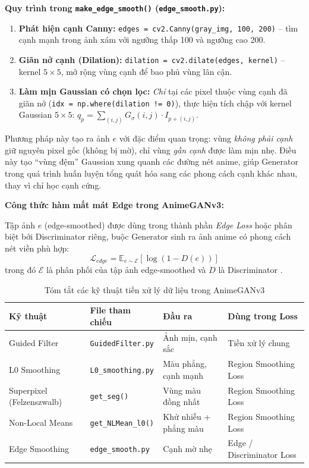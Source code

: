 \textbf{Quy trình trong \texttt{make\_edge\_smooth()} (\texttt{edge\_smooth.py}):}
\begin{enumerate}
    \item \textbf{Phát hiện cạnh Canny:} \texttt{edges = cv2.Canny(gray\_img, 100, 200)}
    -- tìm cạnh mạnh trong ảnh xám với ngưỡng thấp 100 và ngưỡng cao 200.
    \item \textbf{Giãn nở cạnh (Dilation):} \texttt{dilation = cv2.dilate(edges, kernel)}
    -- kernel $5 \times 5$, mở rộng vùng cạnh để bao phủ vùng lân cận.
    \item \textbf{Làm mịn Gaussian có chọn lọc:} \textit{Chỉ} tại các pixel thuộc vùng cạnh
    đã giãn nở (\texttt{idx = np.where(dilation != 0)}), thực hiện tích chập với kernel
    Gaussian $5 \times 5$: $q_p = \sum_{(i,j)} G_{\sigma}(i,j) \cdot I_{p+(i,j)}$.
\end{enumerate}

Phương pháp này tạo ra ảnh $e$ với đặc điểm quan trọng: vùng \textit{không phải cạnh} giữ
nguyên pixel gốc (không bị mờ), chỉ vùng \textit{gần cạnh} được làm mịn nhẹ. Điều này
tạo ``vùng đệm'' Gaussian xung quanh các đường nét anime, giúp Generator trong quá trình
huấn luyện tổng quát hóa sang các phong cách cạnh khác nhau, thay vì chỉ học cạnh cứng.

\textbf{Công thức hàm mất mát Edge trong AnimeGANv3:}

Tập ảnh $e$ (edge-smoothed) được dùng trong thành phần \textit{Edge Loss} hoặc phân biệt
bởi Discriminator riêng, buộc Generator sinh ra ảnh anime có phong cách nét viền phù hợp:
\begin{equation}
\label{eq:edge_loss}
\mathcal{L}_{edge} = \mathbb{E}_{e \sim \mathcal{E}}\left[\log(1 - D(e))\right]
\end{equation}
trong đó $\mathcal{E}$ là phân phối của tập ảnh edge-smoothed và $D$ là Discriminator
\cite{Chen2018CartoonGAN, Liu2024}.

\begin{table}[H]
\caption{Tóm tắt các kỹ thuật tiền xử lý dữ liệu trong AnimeGANv3}
\label{tab:preprocessing_summary}
\centering
\begin{tabular}{|p{3cm}|p{3cm}|p{3.5cm}|p{3.5cm}|}
\hline
\textbf{Kỹ thuật} & \textbf{File tham chiếu} & \textbf{Đầu ra} & \textbf{Dùng trong Loss} \\
\hline
Guided Filter & \texttt{GuidedFilter.py} & Ảnh mịn, cạnh sắc & Tiền xử lý chung \\
\hline
L0 Smoothing & \texttt{L0\_smoothing.py} & Màu phẳng, cạnh mạnh & Region Smoothing Loss \\
\hline
Superpixel (Felzenszwalb) & \texttt{get\_seg()} & Vùng màu đồng nhất & Region Smoothing Loss \\
\hline
Non-Local Means & \texttt{get\_NLMean\_l0()} & Khử nhiễu + phẳng màu & Region Smoothing Loss \\
\hline
Edge Smoothing & \texttt{edge\_smooth.py} & Cạnh mờ nhẹ & Edge / Discriminator Loss \\
\hline
\end{tabular}
\end{table}

